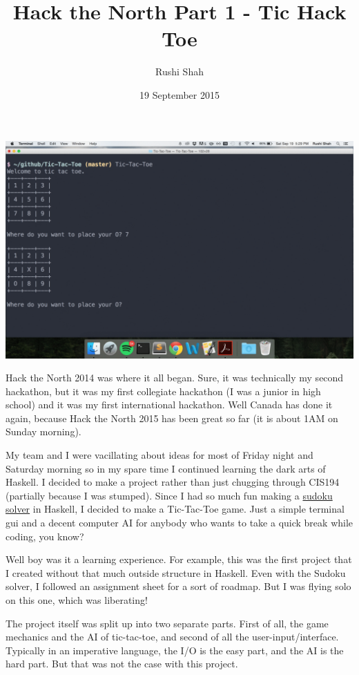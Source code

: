 \documentclass[12pt]{article}
\title{Hack the North Part 1 - Tic Hack Toe}
\author{Rushi Shah}
\date{19 September 2015}
\begin{document}
  \maketitle

  \begin{center}
  \includegraphics[width=6in]{screen_shot}
  \end{center}

  Hack the North 2014 was where it all began. Sure, it was technically my
  second hackathon, but it was my first collegiate hackathon (I was a
  junior in high school) and it was my first international hackathon. Well
  Canada has done it again, because Hack the North 2015 has been great so
  far (it is about 1AM on Sunday morning).

  My team and I were vacillating about ideas for most of Friday night and
  Saturday morning so in my spare time I continued learning the dark arts
  of Haskell. I decided to make a project rather than just chugging
  through CIS194 (partially because I was stumped). Since I had so much
  fun making a \href{https://github.com/2016rshah/sudoku-solver}{sudoku
  solver} in Haskell, I decided to make a Tic-Tac-Toe game. Just a simple
  terminal gui and a decent computer AI for anybody who wants to take a
  quick break while coding, you know?

  Well boy was it a learning experience. For example, this was the first
  project that I created without that much outside structure in Haskell.
  Even with the Sudoku solver, I followed an assignment sheet for a sort
  of roadmap. But I was flying solo on this one, which was liberating!

  The project itself was split up into two separate parts. First of all,
  the game mechanics and the AI of tic-tac-toe, and second of all the
  user-input/interface. Typically in an imperative language, the I/O is
  the easy part, and the AI is the hard part. But that was not the case
  with this project.
\end{document}
